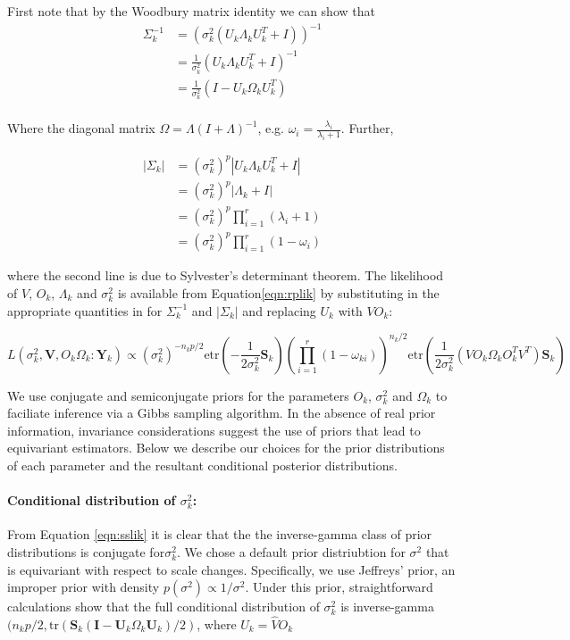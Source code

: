\documentclass{article}
\newcommand{\bl}[1]{{\mathbf #1}}
\newcommand{\tr}{\text{tr}}
\newcommand{\etr}{\text{etr}}
\begin{document}
First note that by the Woodbury matrix identity we can show that 
\begin{align}
\Sigma^{-1}_k &=  (\sigma_k^2(U_k\Lambda_kU_k^T+I))^{-1}\\
&= \frac{1}{\sigma_k^2}(U_k\Lambda_kU_k^T+I)^{-1}\\
&= \frac{1}{\sigma_k^2}(I-U_k\Omega_kU_k^T)\\
\end{align}

Where the diagonal matrix $\Omega = \Lambda(I+\Lambda)^{-1}$, e.g. $\omega_i = \frac{\lambda_i}{\lambda_{i}+1}$.  Further, 

\begin{align}
|\Sigma_k| &= (\sigma_k^2)^{p}|U_k\Lambda_kU_k^T+I|\\
&= (\sigma_k^2)^{p}|\Lambda_k+I| \\
&= (\sigma_k^2)^{p}\prod_{i=1}^r(\lambda_i+1)\\
&= (\sigma_k^2)^{p}\prod_{i=1}^r(1-\omega_i)
\end{align}

where the second line is due to Sylvester's determinant theorem.  The
likelihood of $V$, $O_k$, $\Lambda_k$ and $\sigma_k^2$ is available
from Equation\ref{eqn:rplik} by substituting in the appropriate
quantities in for $\Sigma^{-1}_k$ and $|\Sigma_k|$ and replacing $U_k$
with $VO_k$:

\begin{equation}
 L(\sigma_k^2,\bl V , O_k \Omega_k : \bl Y_k) \propto
    (\sigma_k^2)^{-n_kp/2}\etr(-\frac{1}{2\sigma_k^2}\mathbf{S}_k)\left(\prod_{i=1}^r(1-\omega_{ki})
   \right) ^{n_k/2}
   \etr(\frac{1}{2\sigma_k^2}(VO_k\Omega_kO_k^TV^T)\mathbf{S}_k)
\label{eqn:sslik}
\end{equation}

We use conjugate and semiconjugate priors for the parameters $O_k$,
$\sigma^2_k$ and $\Omega_k$ to faciliate inference via a Gibbs
sampling algorithm.  In the absence of real prior information,
invariance considerations suggest the use of priors that lead to
equivariant estimators.  Below we describe our choices for the prior
distributions of each parameter and the resultant conditional posterior
distributions.

\paragraph{Conditional distribution of $\sigma_k^2$:}

From Equation \ref{eqn:sslik} it is clear that the the inverse-gamma
class of prior distributions is conjugate for$\sigma_k^2$.  We chose a
default prior distriubtion for $\sigma^2$ that is equivariant with
respect to scale changes.  Specifically, we use Jeffreys' prior, an
improper prior with density $p(\sigma^2) \propto 1/\sigma^2 $.  Under
this prior, straightforward calculations show that the full
conditional distribution of $\sigma_k^2$ is
inverse-gamma$( n_k p/2 , \tr(\bl S_k(\bl I -\bl U_k\Omega_k\bl
U_k)/2)$, where $U_k = \hat{V}O_k$
\end{document}
